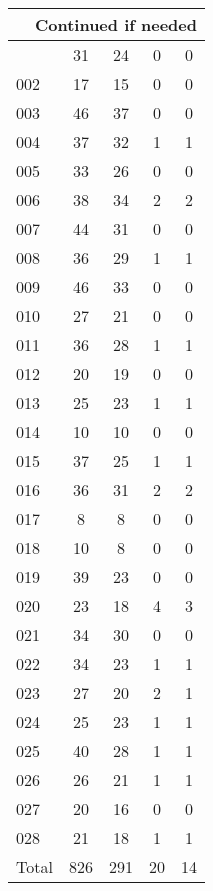 \begin{center}
\begin{longtable}{l|c|c|c|c}
\hline \multicolumn{5}{|r|}{{Continued if needed}} \\ \hline
\endfoot 
001 & 31 & 24 & 0 & 0\\ \hline
002 & 17 & 15 & 0 & 0\\ \hline
003 & 46 & 37 & 0 & 0\\ \hline
004 & 37 & 32 & 1 & 1\\ \hline
005 & 33 & 26 & 0 & 0\\ \hline
006 & 38 & 34 & 2 & 2\\ \hline
007 & 44 & 31 & 0 & 0\\ \hline
008 & 36 & 29 & 1 & 1\\ \hline
009 & 46 & 33 & 0 & 0\\ \hline
010 & 27 & 21 & 0 & 0\\ \hline
011 & 36 & 28 & 1 & 1\\ \hline
012 & 20 & 19 & 0 & 0\\ \hline
013 & 25 & 23 & 1 & 1\\ \hline
014 & 10 & 10 & 0 & 0\\ \hline
015 & 37 & 25 & 1 & 1\\ \hline
016 & 36 & 31 & 2 & 2\\ \hline
017 & 8 & 8 & 0 & 0\\ \hline
018 & 10 & 8 & 0 & 0\\ \hline
019 & 39 & 23 & 0 & 0\\ \hline
020 & 23 & 18 & 4 & 3\\ \hline
021 & 34 & 30 & 0 & 0\\ \hline
022 & 34 & 23 & 1 & 1\\ \hline
023 & 27 & 20 & 2 & 1\\ \hline
024 & 25 & 23 & 1 & 1\\ \hline
025 & 40 & 28 & 1 & 1\\ \hline
026 & 26 & 21 & 1 & 1\\ \hline
027 & 20 & 16 & 0 & 0\\ \hline
028 & 21 & 18 & 1 & 1\\ \hline
\hline \hline
Total & 826 & 291 & 20 & 14



\end{longtable}
\end{center}
 
 



\scriptsize



